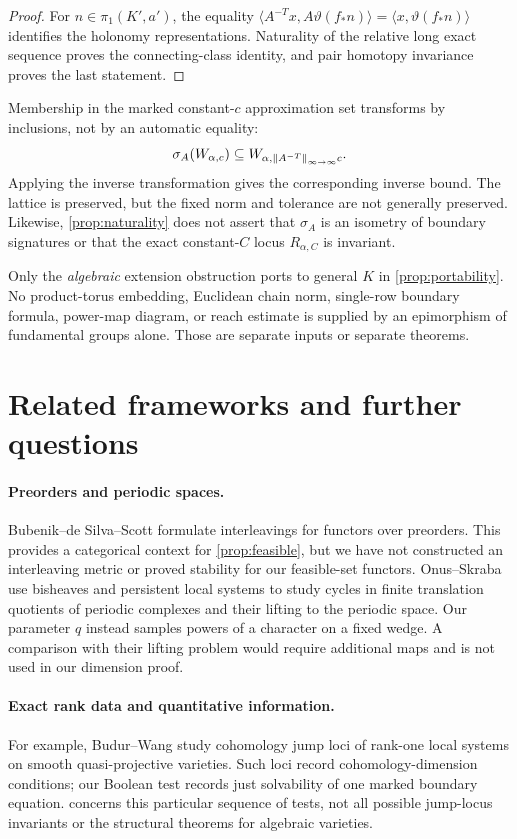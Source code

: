 \documentclass[11pt,a4paper]{article}
\begin{document}
\begin{proof}
For $n\in\pi_1(K',a')$, the equality
$\langle A^{-T}x,A\vartheta(f_*n)\rangle
 =\langle x,\vartheta(f_*n)\rangle$ identifies the holonomy
representations.  Naturality of the relative long exact sequence proves
the connecting-class identity, and pair homotopy invariance proves the
last statement.
\end{proof}

Membership in the marked constant-$c$ approximation set transforms by
inclusions, not by an automatic equality:
\[
 \sigma_A(W_{\alpha,c})
     \subseteq W_{\alpha,\left\lVert A^{-T}\right\rVert_{\infty\to\infty}c}.
\]
Applying the inverse transformation gives the corresponding inverse
bound.  The lattice is preserved, but the fixed norm and tolerance are
not generally preserved.  Likewise, \cref{prop:naturality} does not assert
that $\sigma_A$ is an isometry of boundary signatures or that the exact
constant-$C$ locus $R_{\alpha,C}$ is invariant.

Only the \emph{algebraic} extension obstruction ports to general $K$ in
\cref{prop:portability}.  No product-torus embedding, Euclidean chain
norm, single-row boundary formula, power-map diagram, or reach estimate
is supplied by an epimorphism of fundamental groups alone.  Those are
separate inputs or separate theorems.

\section{Related frameworks and further questions}
\label{sec:related}

\paragraph{Preorders and periodic spaces.}
Bubenik--de Silva--Scott \cite{bubenik-desilva-scott} formulate
interleavings for functors over preorders.  This provides a categorical
context for \cref{prop:feasible}, but we have not constructed an
interleaving metric or proved stability for our feasible-set functors.
Onus--Skraba \cite{onus-skraba} use bisheaves and persistent local systems
to study cycles in finite translation quotients of periodic complexes
and their lifting to the periodic space.  Our parameter $q$ instead
samples powers of a character on a fixed wedge.  A comparison with their
lifting problem would require additional maps and is not used in our
dimension proof.

\paragraph{Exact rank data and quantitative information.}
For example, Budur--Wang \cite{budur-wang} study cohomology jump loci of
rank-one local systems on smooth quasi-projective varieties.  Such loci
record cohomology-dimension conditions; our Boolean test records just
solvability of one marked boundary equation.  
concerns this particular sequence of tests, not all possible jump-locus
invariants or the structural theorems for algebraic varieties.
\end{document}
